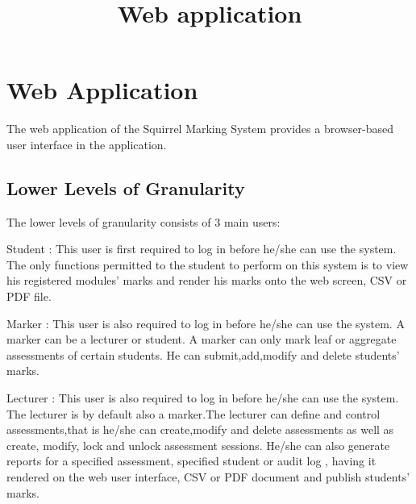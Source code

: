\documentclass{article}
\title{Web application}
\author{}
\begin{document}
\maketitle

\section{Web Application}
The web application of the Squirrel Marking System provides a browser-based user interface in the application.

\subsection{Lower Levels of Granularity}
The lower levels of granularity consists of 3 main users:

Student : This user is first required to log in before he/she can use the system. The only functions  permitted to the student to perform on this system is to view his registered modules' 	marks and render his marks onto the web screen, CSV or PDF file.

Marker : This user is also required to log in before he/she can use the system. A marker can be a 	lecturer or student. A marker can only mark leaf or aggregate assessments of certain students. He can submit,add,modify and delete students' marks.

Lecturer : This user is also required to log in before he/she can use the system. The lecturer is by default also a marker.The lecturer can define and control assessments,that is he/she can   		create,modify and delete assessments as well as create, modify, lock and unlock assessment sessions. He/she can also generate reports for a specified assessment, specified student or audit log , having it rendered on the web user interface, CSV or PDF document and publish students' marks.
\end{document}
